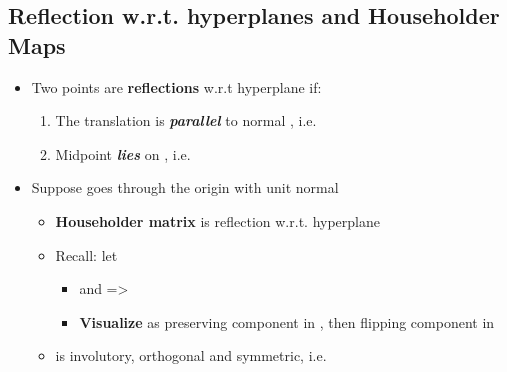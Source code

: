 \subsection*{Reflection w.r.t. hyperplanes and Householder
Maps}

\begin{itemize}

\item
  Two points  are
  \textbf{reflections} w.r.t hyperplane
   if:

  \begin{enumerate}
  \def\labelenumi{\arabic{enumi})}
  
  \item
    The translation
    is \textbf{\emph{parallel}} to normal ,
    i.e.~
  \item
    Midpoint 
    \textbf{\emph{lies}} on ,
    i.e.~
  \end{enumerate}
\item
  Suppose
  goes through the origin with unit normal

  \begin{itemize}
  
  \item
    \textbf{Householder matrix}
    is reflection w.r.t. hyperplane 
  \item
    Recall: let

    \begin{itemize}
    
    \item
      and
      =\textgreater{}
    \item
      \textbf{Visualize} as preserving component in
      , then flipping component in
    \end{itemize}
  \item
     is involutory, orthogonal and
    symmetric,
    i.e.~
  \end{itemize}
\end{itemize}